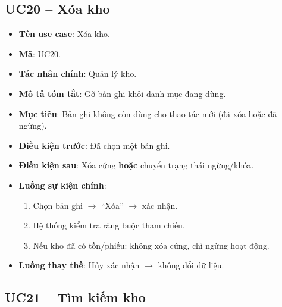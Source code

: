 \subsection{UC20 -- Xóa kho}

\begin{itemize}[leftmargin=1.5cm]
    \item \textbf{Tên use case}: Xóa kho.
    \item \textbf{Mã}: UC20.
    \item \textbf{Tác nhân chính}: Quản lý kho.
    \item \textbf{Mô tả tóm tắt}: Gỡ bản ghi khỏi danh mục đang dùng.
    \item \textbf{Mục tiêu}: Bản ghi không còn dùng cho thao tác mới (đã xóa hoặc đã ngừng).
    \item \textbf{Điều kiện trước}: Đã chọn một bản ghi.
    \item \textbf{Điều kiện sau}: Xóa cứng \textbf{hoặc} chuyển trạng thái ngừng/khóa.
    \item \textbf{Luồng sự kiện chính}:
    \begin{enumerate}
        \item Chọn bản ghi $\rightarrow$ ``Xóa'' $\rightarrow$ xác nhận.
        \item Hệ thống kiểm tra ràng buộc tham chiếu.
        \item Nếu kho đã có tồn/phiếu: không xóa cứng, chỉ ngừng hoạt động.
    \end{enumerate}
    \item \textbf{Luồng thay thế}: Hủy xác nhận $\rightarrow$ không đổi dữ liệu.
\end{itemize}


\subsection{UC21 -- Tìm kiếm kho}

